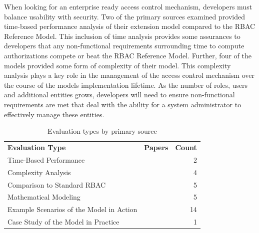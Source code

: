 When looking for an enterprise ready access control mechanism, developers must balance usability with security. 
Two of the primary sources examined provided time-based performance analysis of their extension model compared
to the RBAC Reference Model. This inclusion of time analysis provides some assurances to developers that any non-functional
requirements surrounding time to compute authorizations compete or beat the RBAC Reference Model. Further, four of the models provided
some form of complexity of their model. This complexity analysis plays a key role in the management of the access control mechanism
over the course of the models implementation lifetime. As the number of roles, users and additional entities grows, developers will 
need to ensure non-functional requirements are met that deal with the ability for a system administrator to effectively manage these
entities.


\begin{table}
\centering
\caption{Evaluation types by primary source}
\vspace{0.1 in}
\begin{tabular*}{.9\linewidth}{| p{.45\linewidth} | p{.3\linewidth} | r | }
\cline{1-3}

\textbf{Evaluation Type} & \textbf{Papers} & \textbf{Count} \\ \cline{1-3}
Time-Based Performance
&
\cite{ni2010privacy}
\cite{aich09:role}
&
2 \\ \cline{1-3}
Complexity Analysis
&
\cite{bao08:role}
\cite{zhang06:collaborative}
\cite{chen08:spatio-temporal}
\cite{aich09:role}
&
4 \\ \cline{1-3}
Comparison to Standard RBAC
& 
\cite{bao08:role}
\cite{zou2009crbac}
\cite{zhang06:collaborative}
\cite{zhao2008flexible}
\cite{ray07:spatio}
&
5 \\ \cline{1-3}
Mathematical Modeling
& 
\cite{damiani2007geo}
\cite{hansen2003spatial}
\cite{aich07:STARBAC}
\cite{chen08:spatio-temporal}
\cite{joshi05:generalized}
&
5 \\ \cline{1-3}
Example Scenarios of the Model in Action
& 
\cite{alam06:constraint}
\cite{tzelepi01:flexible}
\cite{cholewka00:acontext-sensitive}
\cite{huang06:pervasive}
\cite{bao08:role}
\cite{jian2008extended}
\cite{yamazaki04:designing}
\cite{zou2009crbac}
\cite{ray07:spatio}
\cite{samuel07:spatio-temporal}
\cite{joshi05:generalized}
\cite{yao2008task}
\cite{zhou2007team}
\cite{oh2003task}
&
14 \\ \cline{1-3}
Case Study of the Model in Practice
&
\cite{motta03:contextual}
&
1 \\ \cline{1-3}

\end{tabular*}
\label{tab:implementations}
\end{table}

